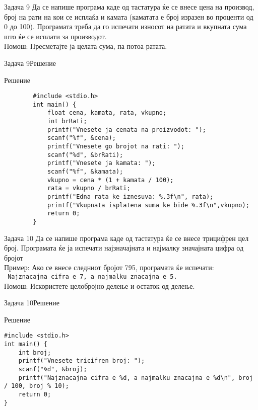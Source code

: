 \begin{frame}[fragile]{Задача 9}
Да се напише програма каде од тастатура ќе се внесе цена на производ, број на рати на кои се исплаќа и 
камата (каматата е број изразен во проценти од 0 до 100). 
Програмата треба да го испечати износот на ратата и вкупната сума што ќе се исплати за производот.\\
Помош: Пресметајте ја целата сума, па потоа ратата.
\end{frame}

\begin{frame}[fragile]{Задача 9}{Решение}
	\begin{exampleblock}{Решение}
		\begin{lstlisting}
		#include <stdio.h>
		int main() {
		    float cena, kamata, rata, vkupno;
		    int brRati;
		    printf("Vnesete ja cenata na proizvodot: ");
		    scanf("%f", &cena);
		    printf("Vnesete go brojot na rati: ");
		    scanf("%d", &brRati);
		    printf("Vnesete ja kamata: ");
		    scanf("%f", &kamata);
		    vkupno = cena * (1 + kamata / 100);
		    rata = vkupno / brRati;
		    printf("Edna rata ke iznesuva: %.3f\n", rata);
		    printf("Vkupnata isplatena suma ke bide %.3f\n",vkupno);
		    return 0;
		}
		\end{lstlisting}
	\end{exampleblock}
\end{frame}


\begin{frame}[fragile]{Задача 10}
Да се напише програма каде од тастатура ќе се внесе трицифрен цел број. Програмата ќе ја испечати најзначајната и најмалку значајната цифра од бројот\\
Пример: Ако се внесе следниот бројот 795, програмата ќе испечати:\\
\texttt{	Najznacajna cifra e 7, a najmalku znacajna e 5.}\\
Помош: Искористете целобројно делење и остаток од делење.
\end{frame}

\begin{frame}[fragile]{Задача 10}{Решение}
	\begin{exampleblock}{Решение}
		\begin{lstlisting}
#include <stdio.h>
int main() {
    int broj;
    printf("Vnesete tricifren broj: ");
    scanf("%d", &broj);
    printf("Najznacajna cifra e %d, a najmalku znacajna e %d\n", broj / 100, broj % 10);
    return 0;
}
		\end{lstlisting}
	\end{exampleblock}
\end{frame}


